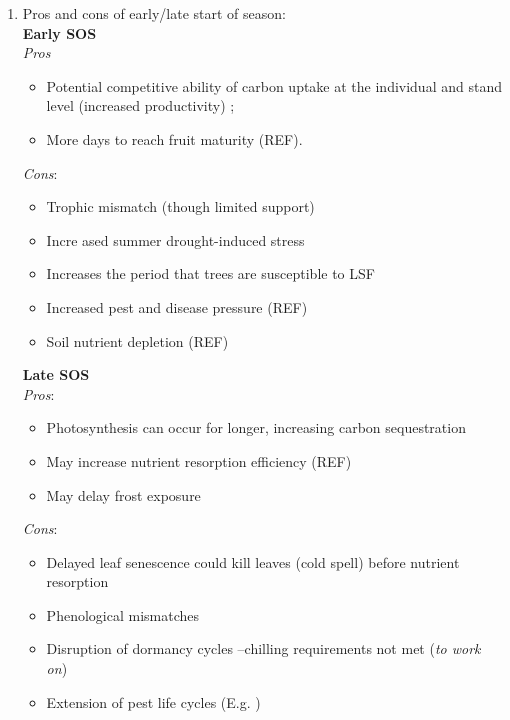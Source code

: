 \documentclass{article}
\begin{document}
\begin{enumerate}
	\item Pros and cons of early/late start of season: \\  %
		\textbf{Early SOS}\\
		\textit{Pros} 
			\begin {itemize}
				\item Potential competitive ability of carbon uptake at the individual and stand level (increased productivity) \cite{estiarte_alteration_2015}; 
				\item More days to reach fruit maturity (REF). 
			\end {itemize}
		\textit{Cons}: 
			\begin {itemize}
				\item Trophic mismatch (though limited support) \cite{loughnan_phenology_2024}
				\item Incre	ased summer drought-induced stress \cite{li_widespread_2023}
				\item Increases the period that trees are susceptible to LSF \cite{meyer_frost_2024}
				\item Increased pest and disease pressure (REF)
				\item Soil nutrient depletion (REF)
			\end {itemize}
		\textbf{Late SOS} \\
		\textit{Pros}: 
			\begin {itemize}
				\item Photosynthesis can occur for longer, increasing carbon sequestration \cite{keenan_net_2014}
				\item May increase nutrient resorption efficiency (REF)
				\item May delay frost exposure \cite{gunderson_forest_2012}
			\end {itemize}
		\textit{Cons}: 
			\begin {itemize}
				\item Delayed leaf senescence could kill leaves (cold spell) before nutrient resorption \cite{estiarte_alteration_2015}
				\item Phenological mismatches \cite{piao_plant_2019}
				\item Disruption of dormancy cycles --chilling requirements not met (\textit{to work on})
				\item Extension of pest life cycles (E.g. \cite{bentz_western_2023})
			\end {itemize}
\end{enumerate}
\end{document}
